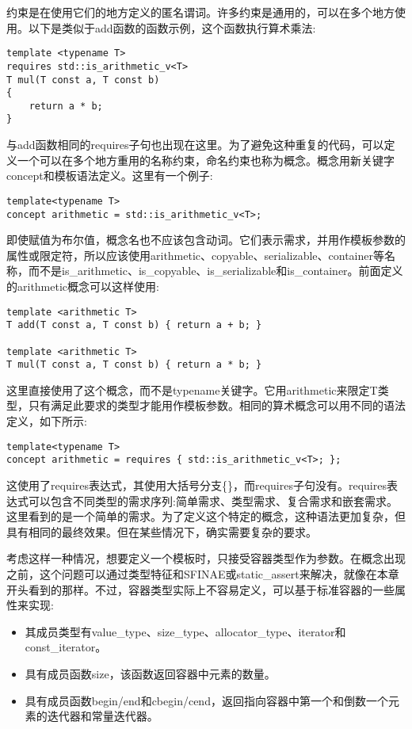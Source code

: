 约束是在使用它们的地方定义的匿名谓词。许多约束是通用的，可以在多个地方使用。以下是类似于add函数的函数示例，这个函数执行算术乘法:

\begin{lstlisting}[style=styleCXX]
template <typename T>
requires std::is_arithmetic_v<T>
T mul(T const a, T const b)
{
	return a * b;
}
\end{lstlisting}

与add函数相同的requires子句也出现在这里。为了避免这种重复的代码，可以定义一个可以在多个地方重用的名称约束，命名约束也称为概念。概念用新关键字concept和模板语法定义。这里有一个例子:

\begin{lstlisting}[style=styleCXX]
template<typename T>
concept arithmetic = std::is_arithmetic_v<T>;
\end{lstlisting}

即使赋值为布尔值，概念名也不应该包含动词。它们表示需求，并用作模板参数的属性或限定符，所以应该使用arithmetic、copyable、serializable、container等名称，而不是is\_arithmetic、is\_copyable、is\_serializable和is\_container。前面定义的arithmetic概念可以这样使用:

\begin{lstlisting}[style=styleCXX]
template <arithmetic T>
T add(T const a, T const b) { return a + b; }

template <arithmetic T>
T mul(T const a, T const b) { return a * b; }
\end{lstlisting}

这里直接使用了这个概念，而不是typename关键字。它用arithmetic来限定T类型，只有满足此要求的类型才能用作模板参数。相同的算术概念可以用不同的语法定义，如下所示:

\begin{lstlisting}[style=styleCXX]
template<typename T>
concept arithmetic = requires { std::is_arithmetic_v<T>; };
\end{lstlisting}

这使用了requires表达式，其使用大括号分支\{\}，而requires子句没有。requires表达式可以包含不同类型的需求序列:简单需求、类型需求、复合需求和嵌套需求。这里看到的是一个简单的需求。为了定义这个特定的概念，这种语法更加复杂，但具有相同的最终效果。但在某些情况下，确实需要复杂的要求。

考虑这样一种情况，想要定义一个模板时，只接受容器类型作为参数。在概念出现之前，这个问题可以通过类型特征和SFINAE或static\_assert来解决，就像在本章开头看到的那样。不过，容器类型实际上不容易定义，可以基于标准容器的一些属性来实现:

\begin{itemize}
\item
其成员类型有value\_type、size\_type、allocator\_type、iterator和const\_iterator。

\item
具有成员函数size，该函数返回容器中元素的数量。

\item
具有成员函数begin/end和cbegin/cend，返回指向容器中第一个和倒数一个元素的迭代器和常量迭代器。
\end{itemize}

